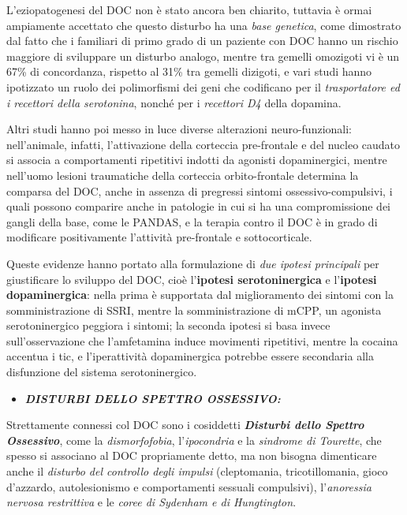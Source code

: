 \documentclass[]{article}
\begin{document}
L'eziopatogenesi del DOC non è stato ancora ben chiarito, tuttavia è
ormai ampiamente accettato che questo disturbo ha una \emph{base
genetica}, come dimostrato dal fatto che i familiari di primo grado di
un paziente con DOC hanno un rischio maggiore di sviluppare un disturbo
analogo, mentre tra gemelli omozigoti vi è un 67\% di concordanza,
rispetto al 31\% tra gemelli dizigoti, e vari studi hanno ipotizzato un
ruolo dei polimorfismi dei geni che codificano per il
\emph{trasportatore ed i recettori della serotonina}, nonché per i
\emph{recettori D4} della dopamina.

Altri studi hanno poi messo in luce diverse alterazioni
neuro-funzionali: nell'animale, infatti, l'attivazione della corteccia
pre-frontale e del nucleo caudato si associa a comportamenti ripetitivi
indotti da agonisti dopaminergici, mentre nell'uomo lesioni traumatiche
della corteccia orbito-frontale determina la comparsa del DOC, anche in
assenza di pregressi sintomi ossessivo-compulsivi, i quali possono
comparire anche in patologie in cui si ha una compromissione dei gangli
della base, come le PANDAS, e la terapia contro il DOC è in grado di
modificare positivamente l'attività pre-frontale e sottocorticale.

Queste evidenze hanno portato alla formulazione di \emph{due ipotesi
principali} per giustificare lo sviluppo del DOC, cioè l'\textbf{ipotesi
serotoninergica} e l'\textbf{ipotesi dopaminergica}: nella prima è
supportata dal miglioramento dei sintomi con la somministrazione di
SSRI, mentre la somministrazione di mCPP, un agonista serotoninergico
peggiora i sintomi; la seconda ipotesi si basa invece sull'osservazione
che l'amfetamina induce movimenti ripetitivi, mentre la cocaina accentua
i tic, e l'iperattività dopaminergica potrebbe essere secondaria alla
disfunzione del sistema serotoninergico.

\begin{itemize}
\item
  \textbf{\emph{DISTURBI DELLO SPETTRO OSSESSIVO:}}
\end{itemize}

Strettamente connessi col DOC sono i cosiddetti \textbf{\emph{Disturbi
dello Spettro Ossessivo}}, come la \emph{dismorfofobia},
l'\emph{ipocondria} e la \emph{sindrome di Tourette}, che spesso si
associano al DOC propriamente detto, ma non bisogna dimenticare anche il
\emph{disturbo del controllo degli impulsi} (cleptomania,
tricotillomania, gioco d'azzardo, autolesionismo e comportamenti
sessuali compulsivi), l'\emph{anoressia nervosa restrittiva} e le
\emph{coree di Sydenham e di Hungtington}.
\end{document}
